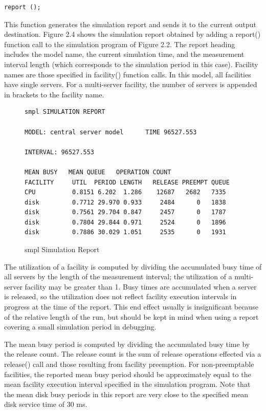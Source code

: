 \begin{verbatim}
report ();
\end{verbatim}

This function generates the simulation report and sends it to the current
output destination. Figure 2.4 shows the simulation report obtained by adding
a report() function call to the simulation program of Figure 2.2. The report
heading includes the model name, the current simulation time, and the
measurement interval length (which corresponds to the simulation period in
this case). Facility names are those specified in facility() function calls. In
this model, all facilities have single servers. For a multi-server facility,
the number of servers is appended in brackets to the facility name.

\begin{figure}[ht]
\centering
\begingroup\small
\begin{verbatim}
smpl SIMULATION REPORT

MODEL: central server model      TIME 96527.553

INTERVAL: 96527.553

MEAN BUSY   MEAN QUEUE   OPERATION COUNT
FACILITY     UTIL  PERIOD LENGTH   RELEASE PREEMPT QUEUE
CPU          0.8151 6.202  1.286    12687   2682   7335
disk         0.7712 29.970 0.933     2484      0   1838
disk         0.7561 29.704 0.847     2457      0   1787
disk         0.7804 29.844 0.971     2524      0   1896
disk         0.7886 30.029 1.051     2535      0   1931
\end{verbatim}
\endgroup
\caption{smpl Simulation Report}
\end{figure}

The utilization of a facility is computed by dividing the accumulated busy
time of all servers by the length of the measurement interval; the
utilization of a multi-server facility may be greater than 1. Busy times are
accumulated when a server is released, so the utilization does not reflect
facility execution intervals in progress at the time of the report. This end
effect usually is insignificant because of the relative length of the run, but
should be kept in mind when using a report covering a small simulation period
in debugging.

The mean busy period is computed by dividing the accumulated busy time by the
release count. The release count is the sum of release operations effected via
a release() call and those resulting from facility preemption. For
non-preemptable facilities, the reported mean busy period should be
approximately equal to the mean facility execution interval specified in the
simulation program. Note that the mean disk busy periods in this report are
very close to the specified mean disk service time of 30 ms.

